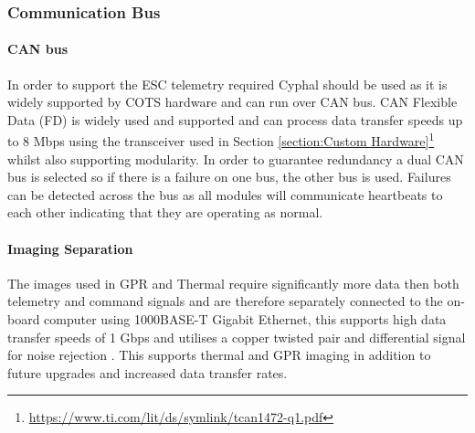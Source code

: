 \subsubsection{Communication Bus}\label{sub_sub_section:tgt_bus}
\paragraph{\gls{CAN} bus}
In order to support the \gls{ESC} telemetry required Cyphal should be used as it is widely supported by \gls{COTS} hardware and can run over \gls{CAN} bus. CAN Flexible Data (FD) is widely used and supported and can process data transfer speeds up to 8 Mbps using the transceiver used in Section \ref{section:Custom Hardware}\footnote{\url{https://www.ti.com/lit/ds/symlink/tcan1472-q1.pdf}} whilst also supporting modularity. In order to guarantee redundancy a dual \gls{CAN} bus is selected so if there is a failure on one bus, the other bus is used. Failures can be detected across the bus as all modules will communicate heartbeats to each other indicating that they are operating as normal.
\paragraph{Imaging Separation}
The images used in GPR and Thermal require significantly more data then both telemetry and command signals and are therefore separately connected to the on-board computer using  1000BASE-T Gigabit Ethernet, this supports high data transfer speeds of 1 Gbps and utilises a copper twisted pair and differential signal for noise rejection \cite{Ethernet}.  This supports thermal and GPR imaging in addition to future upgrades and increased data transfer rates.
